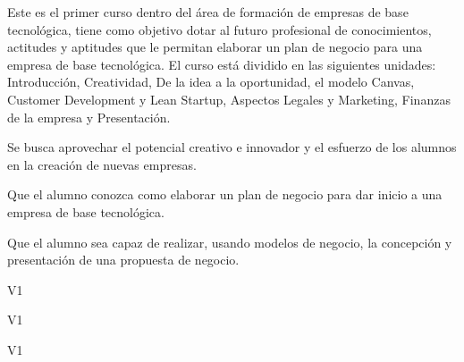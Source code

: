 \begin{syllabus}


\begin{justification}
   Este es el primer curso dentro del área de formación de empresas de
   base tecnológica, tiene como objetivo dotar al futuro profesional 
   de conocimientos, actitudes y aptitudes que le
   permitan elaborar un plan de negocio para una empresa de base tecnológica.
   El curso está dividido en las siguientes unidades:
   Introducción, Creatividad, De la idea a la oportunidad, el modelo Canvas, Customer Development y Lean Startup, Aspectos Legales y Marketing, Finanzas de la empresa y Presentación.
   
   Se busca aprovechar el potencial creativo e innovador y el esfuerzo de los alumnos en la creación de nuevas empresas.
   \end{justification}
   
   \begin{goals}
   \item Que el alumno conozca como elaborar un plan de negocio para dar inicio a una empresa de base tecnológica.
   \item Que el alumno sea capaz de realizar, usando modelos de negocio, la concepción y presentación de una propuesta de negocio.
   \end{goals}
   
\begin{outcomes}{V1}
\end{outcomes}

\begin{specificoutcomes}{V1}
    \item {}
    \item {}
    \item {}
    \item {}
\end{specificoutcomes}
   
\begin{competences}{V1}
    \item {}
    \item {}
    \item {}
    \item {}
    \item {}
    \item {}
    \item {}
    \item {}
\end{competences}
   

\end{syllabus}

